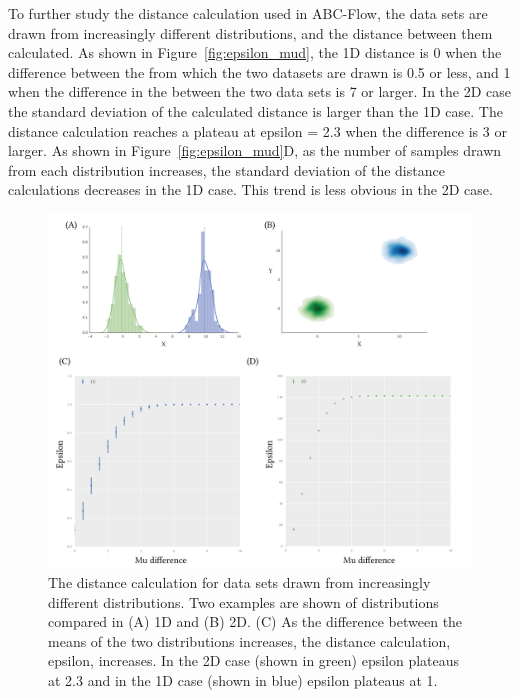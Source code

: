 To further study the distance calculation used in ABC-Flow, the data sets are drawn from increasingly different distributions, and the distance between them calculated. As shown in Figure~\ref{fig:epsilon_mud}, the 1D distance is 0 when the difference between the \textmu{} from which the two datasets are drawn is 0.5 or less, and 1 when the difference in the \textmu{} between the two data sets is 7 or larger. In the 2D case the standard deviation of the calculated distance is larger than the 1D case. The distance calculation reaches a plateau at epsilon = 2.3 when the \textmu{} difference is 3 or larger. As shown in Figure~\ref{fig:epsilon_mud}D, as the number of samples drawn from each distribution increases, the standard deviation of the distance calculations decreases in the 1D case. This trend is less obvious in the 2D case.
\begin{figure}[htbp]
\centering
\includegraphics[scale=0.7]{../../chapters/chapterABCFlow/images/mu_diff.png}
\caption[LoF caption]{\label{fig:epsilon_mud} The distance calculation for data sets drawn from increasingly different distributions. Two examples are shown of distributions compared in (A) 1D and (B) 2D. (C) As the difference between the means of the two distributions increases, the distance calculation, epsilon, increases. In the 2D case (shown in green) epsilon plateaus at 2.3 and in the 1D case (shown in blue) epsilon plateaus at 1.}
\label{fig:normal_example}
\end{figure}



